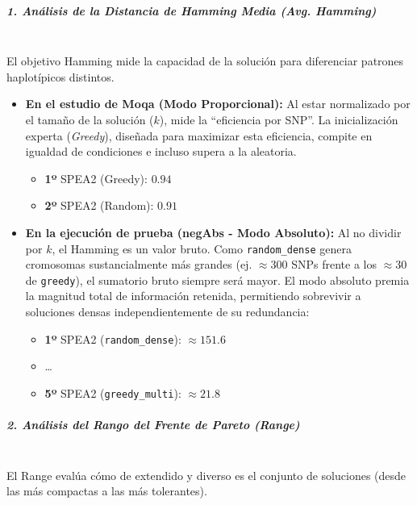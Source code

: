 \documentclass[a4paper,10pt]{article}
\begin{document}
\subparagraph{1. Análisis de la Distancia de Hamming Media (Avg. Hamming)}~\\
El objetivo Hamming mide la capacidad de la solución para diferenciar patrones haplotípicos distintos.

\begin{itemize}
    \item \textbf{En el estudio de Moqa (Modo Proporcional):} Al estar normalizado por el tamaño de la solución ($k$), mide la ``eficiencia por SNP''. La inicialización experta (\textit{Greedy}), diseñada para maximizar esta eficiencia, compite en igualdad de condiciones e incluso supera a la aleatoria.
    \begin{itemize}
        \item \textbf{1º} SPEA2 (Greedy): $0.94$
        \item \textbf{2º} SPEA2 (Random): $0.91$
    \end{itemize}

    \item \textbf{En la ejecución de prueba (negAbs - Modo Absoluto):} Al no dividir por $k$, el Hamming es un valor bruto. Como \texttt{random\_dense} genera cromosomas sustancialmente más grandes (ej. $\approx 300$ SNPs frente a los $\approx 30$ de \texttt{greedy}), el sumatorio bruto siempre será mayor. El modo absoluto premia la magnitud total de información retenida, permitiendo sobrevivir a soluciones densas independientemente de su redundancia:
    \begin{itemize}
        \item \textbf{1º} SPEA2 (\texttt{random\_dense}): $\approx \mathbf{151.6}$
        \item \dots
        \item \textbf{5º} SPEA2 (\texttt{greedy\_multi}): $\approx \mathbf{21.8}$
    \end{itemize}
\end{itemize}

\subparagraph{2. Análisis del Rango del Frente de Pareto (Range)}~\\
El Range evalúa cómo de extendido y diverso es el conjunto de soluciones (desde las más compactas a las más tolerantes).
\end{document}

